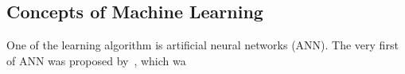 \subsection{Concepts of Machine Learning}
One of the learning algorithm is artificial neural networks (ANN). The very first of ANN was proposed by~\citet{McCulloch_1943}, which wa